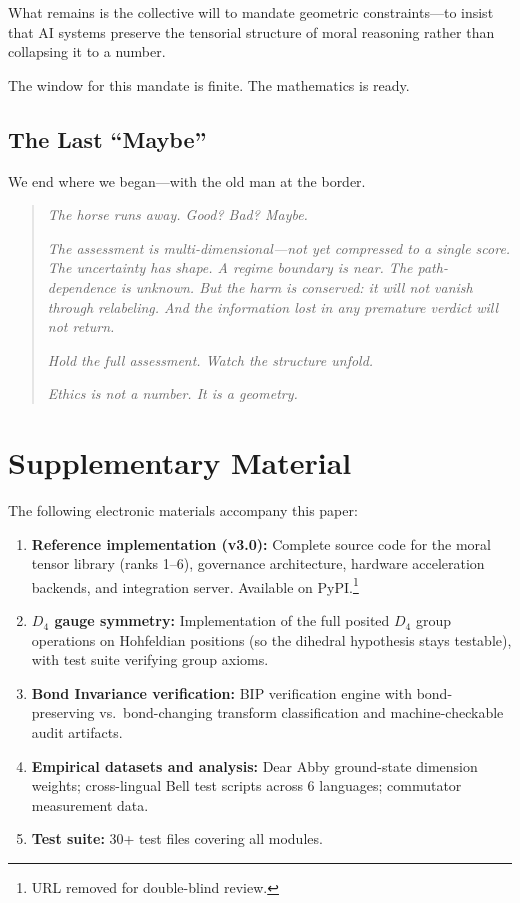 \documentclass[12pt]{article}
\theoremstyle{definition}
\theoremstyle{remark}
\begin{document}
What remains is the collective will to mandate geometric constraints---to insist that AI systems preserve the tensorial structure of moral reasoning rather than collapsing it to a number.

The window for this mandate is finite. The mathematics is ready.

\subsection{The Last ``Maybe''}

We end where we began---with the old man at the border.

\begin{quote}
\emph{The horse runs away. Good? Bad? Maybe.}

\emph{The assessment is multi-dimensional---not yet compressed to a single score. The uncertainty has shape. A regime boundary is near. The path-dependence is unknown. But the harm is conserved: it will not vanish through relabeling. And the information lost in any premature verdict will not return.}

\emph{Hold the full assessment. Watch the structure unfold.}

\emph{Ethics is not a number. It is a geometry.}
\end{quote}


\section*{Supplementary Material}

The following electronic materials accompany this paper:

\begin{enumerate}
    \item \textbf{Reference implementation (v3.0):} Complete source code for the moral tensor library (ranks 1--6), governance architecture, hardware acceleration backends, and integration server. Available on PyPI.\footnote{URL removed for double-blind review.}
    \item \textbf{$D_4$ gauge symmetry:} Implementation of the full posited $D_4$ group operations on Hohfeldian positions (so the dihedral hypothesis stays testable), with test suite verifying group axioms.
    \item \textbf{Bond Invariance verification:} BIP verification engine with bond-preserving vs.\ bond-changing transform classification and machine-checkable audit artifacts.
    \item \textbf{Empirical datasets and analysis:} Dear Abby ground-state dimension weights; cross-lingual Bell test scripts across 6 languages; commutator measurement data.
    \item \textbf{Test suite:} 30+ test files covering all modules.
\end{enumerate}
\end{document}
